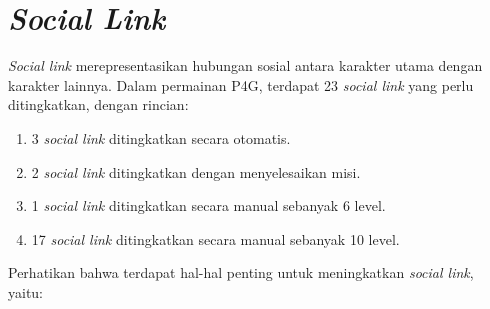 \section{\textit{Social Link}}
\textit{Social link} merepresentasikan hubungan sosial antara karakter utama dengan karakter lainnya. Dalam permainan P4G, terdapat 23 \textit{social link} yang perlu ditingkatkan, dengan rincian:
\begin{enumerate}
    \item 3 \textit{social link} ditingkatkan secara otomatis.
    \item 2 \textit{social link} ditingkatkan dengan menyelesaikan misi.
    \item 1 \textit{social link} ditingkatkan secara manual sebanyak 6 level.
    \item 17 \textit{social link} ditingkatkan secara manual sebanyak 10 level.
\end{enumerate}
Perhatikan bahwa terdapat hal-hal penting untuk meningkatkan \textit{social link}, yaitu:
